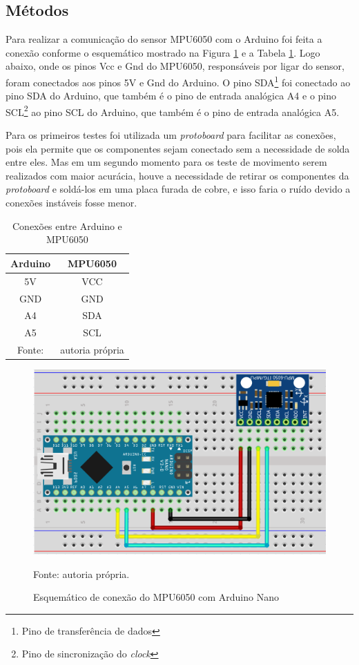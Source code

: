 	\subsection{Métodos}
		
		Para realizar a comunicação do sensor MPU6050 com o Arduino foi feita a conexão conforme o esquemático mostrado na Figura \ref{conexoes} e a Tabela \ref{conexoes_arduino}. Logo abaixo, onde os pinos Vcc e Gnd do MPU6050, responsáveis por ligar do sensor, foram conectados aos pinos 5V e Gnd do Arduino. O pino SDA\footnote{Pino de transferência de dados} foi conectado ao pino SDA do Arduino, que também é o pino de entrada analógica A4 e o pino SCL\footnote{Pino de sincronização do \textit{clock}} ao pino SCL do Arduino, que também é o pino de entrada analógica A5.  
		
		Para os primeiros testes foi utilizada um \textit{protoboard} para facilitar as conexões, pois ela permite que os componentes sejam conectado sem a necessidade de solda entre eles. Mas em um segundo momento para os teste de movimento serem realizados com maior acurácia, houve a necessidade de retirar os componentes da \textit{protoboard} e soldá-los em uma placa furada de cobre, e isso faria o ruído devido a conexões instáveis fosse menor.
		\begin{table}[h] \footnotesize
			\centering
			\caption{Conexões entre Arduino e MPU6050}
			\label{conexoes_arduino}
			
			\begin{tabular}{cc}
				\toprule
				\textbf{Arduino} & \textbf{MPU6050} \\
				\midrule
				5V & VCC \\
				GND & GND \\
				A4 & SDA \\
				A5 & SCL \\
				\bottomrule
				Fonte: & autoria própria
			\end{tabular}
		\end{table}
		
		\begin{figure}[h]
			\centering
			\includegraphics[keepaspectratio=true,scale=0.5]{figuras/conexoes_mpu_arduino.PNG}
			\caption{ Esquemático de conexão do MPU6050 com Arduino Nano }
			Fonte: autoria própria. \footnotesize
			\label{conexoes}	
		\end{figure}
		
